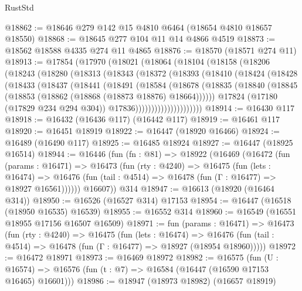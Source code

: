 \begin{lexlean}{RustStd}
\begin{coremodule}
{\begin{coremodule}
{{{{{{{{{{{{{{{{{{{{{{{{{{{{{{{{{{{{{{{{{{{{{{{{{{{{{{{@18862 := @18646 @279 @142 @15 @4810 @6464 (@18654 @4810 @18657 @18550)
@18868 := @18645 @277 @104 @11 @14 @4866 @4519
@18873 := @18562 @18588 @4335 @274 @11 @4865
@18876 := @18570 (@18571 @274 @11)
@18913 := @17854
    (@17970
      (@18021
        (@18064
          (@18104
            (@18158
              (@18206
                (@18243
                  (@18280
                    (@18313
                      (@18343
                        (@18372
                          (@18393
                            (@18410
                              (@18424
                                (@18428
                                  (@18433
                                    (@18437
                                      (@18441
                                        (@18491
                                          (@18584
                                            (@18678
                                              (@18835
                                                (@18840
                                                  (@18845
                                                    (@18853
                                                      (@18862 (@18868 (@18873 @18876) @18664))))))
                                              @17824
                                              (@17180 (@17829 @234 @294 @304))
                                              @17836)))))))))))))))))))))
@18914 := @16430 @117
@18918 := @16432 (@16436 @117) (@16442 @117)
@18919 := @16461 @117
@18920 := @16451 @18919
@18922 := @16447 (@18920 @16466)
@18924 := @16489 (@16490 @117)
@18925 := @16485 @18924
@18927 := @16447 (@18925 @16514)
@18944 := @16446
    (fun (fn : @81) =>
    @18922
      (@16469
        (@16472
          (fun (params : @16471) =>
          @16473
            (fun (rty : @4240) =>
            @16475
              (fun (lets : @16474) =>
              @16476 (fun (tail : @4514) => @16478 (fun (Γ : @16477) => @18927 @16561))))))
        @16607))
    @314
@18947 := @16613 (@18920 (@16464 @314))
@18950 := @16526 (@16527 @314) @17153
@18954 := @16447 (@16518 (@18950 @16535) @16539)
@18955 := @16552 @314
@18960 := @16549 (@16551 @18955 @17156 @16507 @16509)
@18971 := fun (params : @16471) =>
  @16473
    (fun (rty : @4240) =>
    @16475
      (fun (lets : @16474) =>
      @16476 (fun (tail : @4514) => @16478 (fun (Γ : @16477) => @18927 (@18954 @18960)))))
@18972 := @16472 @18971
@18973 := @16469 @18972
@18982 := @16575
    (fun (U : @16574) => @16576 (fun (t : @7) => @16584 (@16447 (@16590 @17153 @16465) @16601)))
@18986 := @18947 (@18973 @18982) (@16657 @18919)
}}}}}}}}}}}}}}}}}}}}}}}}}}}}}}}}}}}}}}}}}}}}}}}}}}}}}}}
\end{coremodule}}
\end{coremodule}
\end{lexlean}
